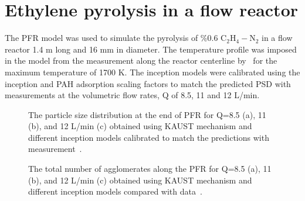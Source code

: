 \section{Ethylene pyrolysis in a flow reactor}
The PFR model was used to simulate the pyrolysis of \%0.6 $\mathrm{C_2H_4-N_2}$ in a flow reactor 1.4 m long and 16 mm in diameter. The temperature profile was imposed in the model from the measurement along the reactor centerline by~\citet{mei2019quantitative} for the maximum temperature of 1700 K. The inception models were calibrated using the inception and PAH adsorption scaling factors to match the predicted PSD with measurements at the volumetric flow rates, Q of 8.5, 11 and 12 L/min.

\begin{figure}[H]
	\centering
	\caption{The particle size distribution at the end of PFR for Q=8.5 (a), 11 (b), and 12 L/min (c) obtained using KAUST mechanism and different inception models calibrated to match the predictions with measurement~\citep{mei2019quantitative}.}
	\label{fig:pfr_psd} 
\end{figure}

\begin{figure}[H]
	\centering
	\caption{The total number of agglomerates along the PFR for Q=8.5 (a), 11 (b), and 12 L/min (c) obtained using KAUST mechanism and different inception models compared with data~\citep{mei2019quantitative}.}
	\label{fig:pfr_Nagg} 
\end{figure}

